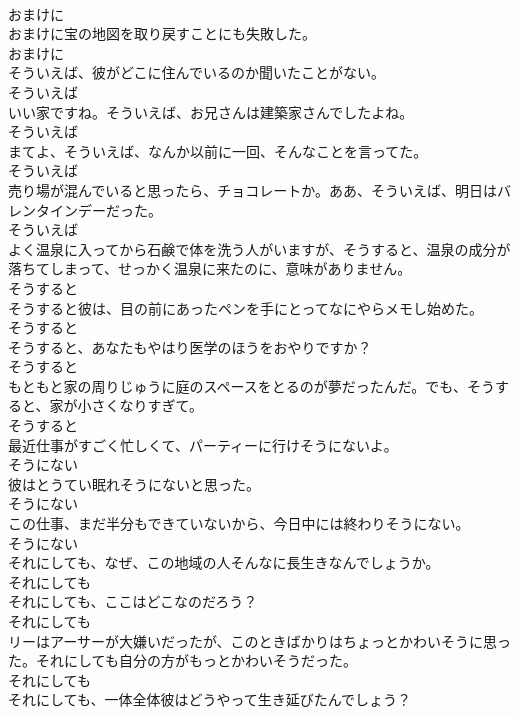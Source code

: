 \documentclass[8pt]{extreport}
\begin{document}
\begin{CJK}{UTF8}{min}
\\	おまけに
\\	おまけに宝の地図を取り戻すことにも失敗した。	
\\	おまけに
\\	そういえば、彼がどこに住んでいるのか聞いたことがない。	
\\	そういえば
\\	いい家ですね。そういえば、お兄さんは建築家さんでしたよね。	
\\	そういえば
\\	まてよ、そういえば、なんか以前に一回、そんなことを言ってた。	
\\	そういえば
\\	売り場が混んでいると思ったら、チョコレートか。ああ、そういえば、明日はバレンタインデーだった。	
\\	そういえば
\\	よく温泉に入ってから石鹸で体を洗う人がいますが、そうすると、温泉の成分が落ちてしまって、せっかく温泉に来たのに、意味がありません。	
\\	そうすると
\\	そうすると彼は、目の前にあったペンを手にとってなにやらメモし始めた。	
\\	そうすると
\\	そうすると、あなたもやはり医学のほうをおやりですか？	
\\	そうすると
\\	もともと家の周りじゅうに庭のスペースをとるのが夢だったんだ。でも、そうすると、家が小さくなりすぎて。	
\\	そうすると
\\	最近仕事がすごく忙しくて、パーティーに行けそうにないよ。	
\\	そうにない
\\	彼はとうてい眠れそうにないと思った。	
\\	そうにない
\\	この仕事、まだ半分もできていないから、今日中には終わりそうにない。	
\\	そうにない
\\	それにしても、なぜ、この地域の人そんなに長生きなんでしょうか。	
\\	それにしても
\\	それにしても、ここはどこなのだろう？	
\\	それにしても
\\	リーはアーサーが大嫌いだったが、このときばかりはちょっとかわいそうに思った。それにしても自分の方がもっとかわいそうだった。	
\\	それにしても
\\	それにしても、一体全体彼はどうやって生き延びたんでしょう？	

\end{CJK}
\end{document}
